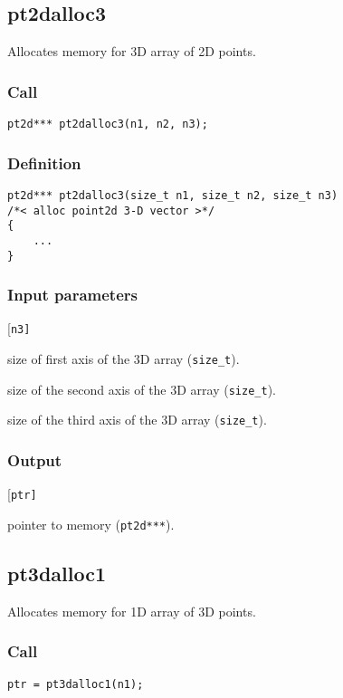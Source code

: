 \subsection{{pt2dalloc3}}
Allocates memory for 3D array of 2D points.

\subsubsection*{Call}
\begin{verbatim}
pt2d*** pt2dalloc3(n1, n2, n3);\end{verbatim}

\subsubsection*{Definition}
\begin{verbatim}
pt2d*** pt2dalloc3(size_t n1, size_t n2, size_t n3)
/*< alloc point2d 3-D vector >*/
{
    ...
}
\end{verbatim}

\subsubsection*{Input parameters}
\begin{desclist}{\tt }{\quad}[\tt n3]
   \setlength\itemsep{0pt}
   \item[n1] size of first axis of the 3D array (\texttt{size\_t}).
   \item[n2] size of the second axis of the 3D array (\texttt{size\_t}).
   \item[n3] size of the third axis of the 3D array (\texttt{size\_t}).
\end{desclist}

\subsubsection*{Output}
\begin{desclist}{\tt }{\quad}[\tt ptr]
   \setlength\itemsep{0pt}
   \item[ptr] pointer to memory (\texttt{pt2d***}).
\end{desclist}




\subsection{{pt3dalloc1}}
Allocates memory for 1D array of 3D points.

\subsubsection*{Call}
\begin{verbatim}ptr = pt3dalloc1(n1);\end{verbatim}


